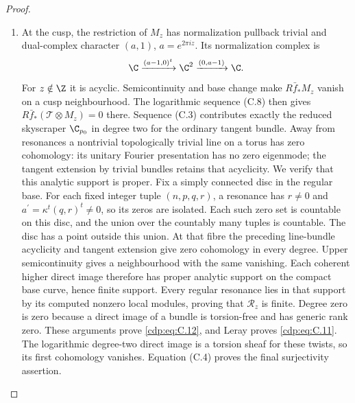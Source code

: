 \begin{proof}
\begin{enumerate}[label={$\langle1\rangle$\arabic*.},leftmargin=*]
\item At the cusp, the restriction of $M_z$ has normalization pullback trivial and dual-complex character $(a,1)$, $a=e^{2\pi iz}$. Its normalization complex is
\[
 \C\xrightarrow{(a-1,0)^t}\C^2
 \xrightarrow{(0,a-1)}\C.
\]
For $z\notin\Z$ it is acyclic. Semicontinuity and base change make $R\bar f_*M_z$ vanish on a cusp neighbourhood. The logarithmic sequence (C.8) then gives $R\bar f_*(\mathcal T\otimes M_z)=0$ there. Sequence (C.3) contributes exactly the reduced skyscraper $\C_{p_0}$ in degree two for the ordinary tangent bundle. Away from resonances a nontrivial topologically trivial line on a torus has zero cohomology: its unitary Fourier presentation has no zero eigenmode; the tangent extension by trivial bundles retains that acyclicity. We verify that this analytic support is proper. Fix a simply connected disc in the regular base. For each fixed integer tuple $(n,p,q,r)$, a resonance has $r\ne0$ and $a^\prime=\kappa^t(q,r)^t\ne0$, so its zeros are isolated. Each such zero set is countable on this disc, and the union over the countably many tuples is countable. The disc has a point outside this union. At that fibre the preceding line-bundle acyclicity and tangent extension give zero cohomology in every degree. Upper semicontinuity gives a neighbourhood with the same vanishing. Each coherent higher direct image therefore has proper analytic support on the compact base curve, hence finite support. Every regular resonance lies in that support by its computed nonzero local modules, proving that $\mathcal R_z$ is finite. Degree zero is zero because a direct image of a bundle is torsion-free and has generic rank zero. These arguments prove \eqref{cdp:eq:C.12}, and Leray proves \eqref{cdp:eq:C.11}. The logarithmic degree-two direct image is a torsion sheaf for these twists, so its first cohomology vanishes. Equation (C.4) proves the final surjectivity assertion.

\end{enumerate}
\end{proof}
